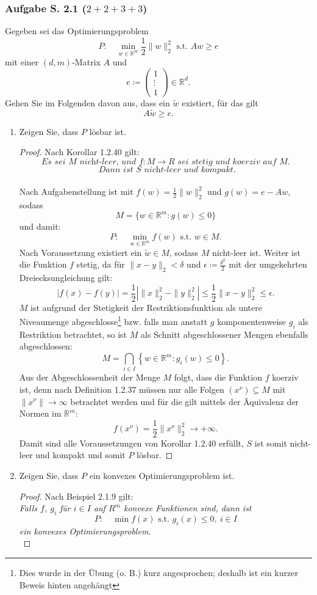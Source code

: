 \documentclass[12pt]{extreport} %
\newcommand{\R}{\mathbb{R}}
\theoremstyle{named}
\theoremstyle{nnamed}
\theoremstyle{itshape}
\theoremstyle{normal}
\begin{document}
\subsubsection{Aufgabe S. 2.1 (\textit{$2 + 2 + 3 + 3$})} 

Gegeben sei das Optimierungsproblem
$$ P: \quad \min_{w \in \R^m} \frac{1}{2} \| w \|_2^2 \text{ s.t. } Aw \geq e $$
mit einer $(d, m)$-Matrix $A$ und
$$ e \coloneqq \left(\begin{array}{c} 1 \\ \vdots \\ 1 \end{array}\right) \in \R^d. $$
Gehen Sie im Folgenden davon aus, dass ein $\tilde{w}$ existiert, für das gilt
$$ A \tilde{w} \geq e. $$
\begin{enumerate}
	\item Zeigen Sie, dass $P$ lösbar ist.
		\begin{proof}
			Nach Korollar 1.2.40 gilt:
				$$ \textit{Es sei } M \textit{ nicht-leer, und } f \colon M \rightarrow R \textit{ sei stetig und koerziv auf } M. $$
				$$ \textit{ Dann ist } S \textit{ nicht-leer und kompakt.} $$ ~\\
			Nach Aufgabenstellung ist mit $f(w) = \frac{1}{2} \| w \|_2^2$ und $g(w) = e - Aw$, sodass 
				$$ M = \{ w \in \R^m \colon  g(w) \leq 0 \} $$ 
			und damit:
				$$ P: \quad \min_{w \in \R^m} f(w) \text{ s.t. } w \in M. $$
			Nach Voraussetzung existiert ein $\tilde{w} \in M$, sodass $M$ nicht-leer ist. Weiter ist die Funktion $f$ stetig, da für $\| x - y \|_2 < \delta$ und $\epsilon \coloneqq \frac{\delta^2}{2}$ mit der umgekehrten Dreiecksungleichung gilt:	
			$$ \left| f(x) - f(y) \right| = \frac{1}{2} \left| \| x \|^2_2 - \| y \|_2^2 \right| \leq \frac{1}{2} \| x - y \|_2^2 \leq \epsilon. $$
			$M$ ist aufgrund der Stetigkeit der Restriktionsfunktion als untere Niveaumenge abgeschlosse\footnote{Dies wurde in der Übung (o. B.) kurz angesprochen; deshalb ist ein kurzer Beweis hinten angehängt} bzw. falls man anstatt $g$ komponentenweise $g_i$ als Restriktion betrachtet, so ist $M$ als Schnitt abgeschlossener Mengen ebenfalls abgeschlossen:
			$$ M = \bigcap_{i \in I } \left\{ w \in \R^m \colon g_i(w) \leq 0 \right\}. $$
			 Aus der Abgeschlossenheit der Menge $M$ folgt, dass die Funktion $f$ koerziv ist, denn nach Definition 1.2.37 müssen nur alle Folgen $(x^\nu) \subseteq M$ mit $\| x^\nu \| \rightarrow \infty$ betrachtet werden und für die gilt mittels der Äquivalenz der Normen im $\R^m$:
			$$ f(x^\nu) = \frac{1}{2} \| x^\nu \|_2^2 \longrightarrow +\infty. $$
			Damit sind alle Voraussetzungen von Korollar 1.2.40 erfüllt, $S$ ist somit nicht-leer und kompakt und somit $P$ lösbar.
		\end{proof}
	\item Zeigen Sie, dass $P$ ein konvexes Optimierungsproblem ist.
		\begin{proof}
		Nach Beispiel 2.1.9 gilt: ~\\
			\textit{Falls $f$, $g_i$ für $i \in I$ auf $R^m$ konvexe Funktionen sind, dann ist}
			$$P: \quad \min f(x) \text{ s.t. } g_i (x) \leq 0, ~ i \in I $$
			\textit{ein konvexes Optimierungsproblem.} ~\\
			

\end{proof}
\end{enumerate}
\end{document}
